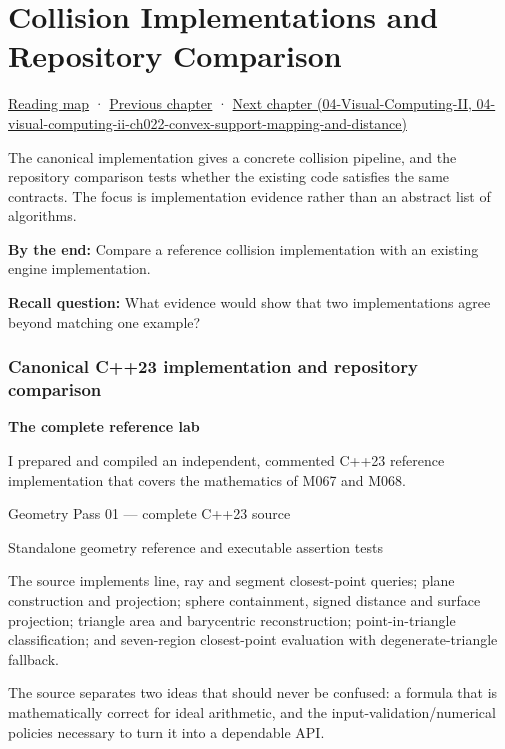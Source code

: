 \hypertarget{03-visual-computing-i-ch021}{}
\chapter{Collision Implementations and Repository Comparison}\label{03-visual-computing-i-ch021-collision-implementations-and-repository-comparison}

\hyperref[volume-reading-map]{Reading map} · \hyperref[03-visual-computing-i-ch020-geometry-queries-from-scene-to-contact]{Previous chapter} · \href{../04-Visual-Computing-II/main.pdf\#nameddest=04-visual-computing-ii-ch022-convex-support-mapping-and-distance}{Next chapter (04-Visual-Computing-II, 04-visual-computing-ii-ch022-convex-support-mapping-and-distance)}

The canonical implementation gives a concrete collision pipeline, and the repository comparison tests whether the existing code satisfies the same contracts. The focus is implementation evidence rather than an abstract list of algorithms.

\textbf{By the end:} Compare a reference collision implementation with an existing engine implementation.

\textbf{Recall question:} What evidence would show that two implementations agree beyond matching one example?

\subsection{Canonical C++23 implementation and repository comparison}\label{03-visual-computing-i-ch021-canonical-c23-implementation-and-repository-comparison}

\textbf{The complete reference lab}

I prepared and compiled an independent, commented C++23 reference implementation that covers the mathematics of M067 and M068.

Geometry Pass 01 --- complete C++23 source

Standalone geometry reference and executable assertion tests

The source implements line, ray and segment closest-point queries; plane construction and projection; sphere containment, signed distance and surface projection; triangle area and barycentric reconstruction; point-in-triangle classification; and seven-region closest-point evaluation with degenerate-triangle fallback.

The source separates two ideas that should never be confused: a formula that is mathematically correct for ideal arithmetic, and the input-validation/numerical policies necessary to turn it into a dependable API.

